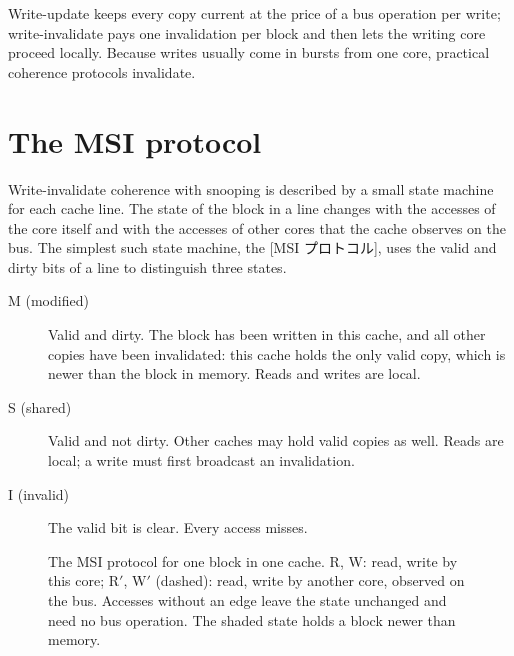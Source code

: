 \documentclass[../main.tex]{subfiles}
\begin{document}
\begin{keypoint}
  Write-update keeps every copy current at the price of a bus operation per
  write; write-invalidate pays one invalidation per block and then lets the
  writing core proceed locally.  Because writes usually come in bursts from
  one core, practical coherence protocols invalidate.
\end{keypoint}

\section{The MSI protocol}
\label{sec:l19-msi}

Write-invalidate coherence with snooping is described by a small state
machine for each cache line.
The state of the block in a line changes with the accesses of the core itself
and with the accesses of other cores that the cache observes on the bus.  The
simplest such state machine, the [MSI プロトコル], uses
the valid and dirty bits of a line to distinguish three states.
\begin{description}
  \item[M (modified)] Valid and dirty.  The block has been written in this
    cache, and all other copies have been invalidated: this cache holds the
    only valid copy, which is newer than the block in memory.  Reads and
    writes are local.
  \item[S (shared)] Valid and not dirty.  Other caches may hold valid copies
    as well.  Reads are local; a write must first broadcast an invalidation.
  \item[I (invalid)] The valid bit is clear.  Every access misses.
\end{description}

\begin{figure}[htbp]
  \centering
  
  \caption{The MSI protocol for one block in one cache.  R, W: read, write by
    this core; R$'$, W$'$ (dashed): read, write by another core, observed on
    the bus.  Accesses without an edge leave the state unchanged and need no
    bus operation.  The shaded state holds a block newer than memory.}
  \label{fig:l19-msi}
\end{figure}
\end{document}
